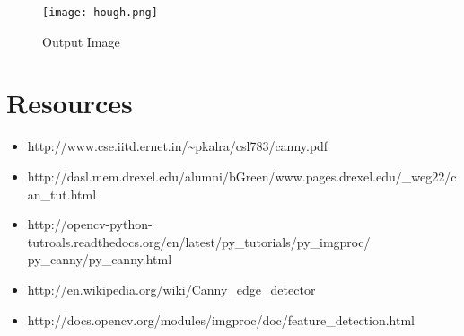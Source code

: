 \documentclass[]{article}
\providecommand{\tightlist}{%
  \setlength{\itemsep}{0pt}\setlength{\parskip}{0pt}}
\begin{document}
\begin{figure}[htbp]
\centering
\texttt{[image: hough.png]}
\caption{Output Image}
\end{figure}

\newpage
\section{Resources}\label{resources}

\begin{itemize}
\tightlist
\item
  http://www.cse.iitd.ernet.in/\textasciitilde{}pkalra/csl783/canny.pdf
\item
  http://dasl.mem.drexel.edu/alumni/bGreen/www.pages.drexel.edu/\_weg22/can\_tut.html
\item
  http://opencv-python-tutroals.readthedocs.org/en/latest/py\_tutorials/py\_imgproc/
  py\_canny/py\_canny.html
\item
  http://en.wikipedia.org/wiki/Canny\_edge\_detector
\item
  http://docs.opencv.org/modules/imgproc/doc/feature\_detection.html
\end{itemize}
\end{document}
